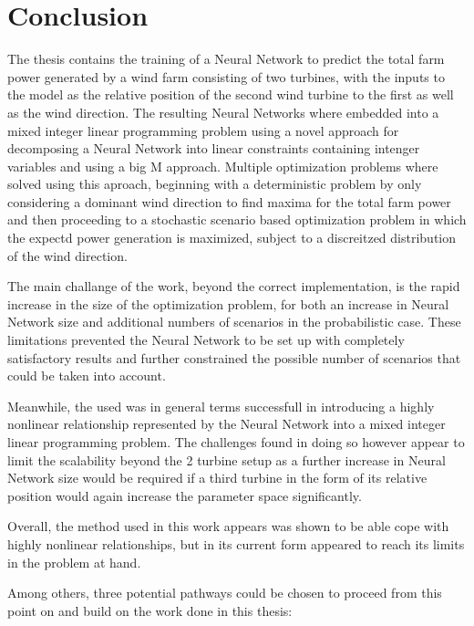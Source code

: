 
\chapter{Conclusion}\label{chapter:conclusion}

The thesis contains the training of a Neural Network to predict the total farm power generated by a wind farm consisting of two turbines, with the inputs to the model as the relative position of the second wind turbine to the first as well as the wind direction. The resulting Neural Networks where embedded into a mixed integer linear programming problem using a novel approach for decomposing a Neural Network into linear constraints containing intenger variables and using a big M approach. Multiple optimization problems where solved using this aproach, beginning with a deterministic problem by only considering a dominant wind direction to find maxima for the total farm power and then proceeding to a stochastic scenario based optimization problem in which the expectd power generation is maximized, subject to a discreitzed distribution of the wind direction. 

The main challange of the work, beyond the correct implementation, is the rapid increase in the size of the optimization problem, for both an increase in Neural Network size and additional numbers of scenarios in the probabilistic case. These limitations prevented the Neural Network to be set up with completely satisfactory results and further constrained the possible number of scenarios that could be taken into account. 

Meanwhile, the used was in general terms successfull in introducing a highly nonlinear relationship represented by the Neural Network into a mixed integer linear programming problem. The challenges found in doing so however appear to limit the scalability beyond the 2 turbine setup as a further increase in Neural Network size would be required if a third turbine in the form of its relative position would again increase the parameter space significantly. 

Overall, the method used in this work appears was shown to be able cope with highly nonlinear relationships, but in its current form appeared to reach its limits in the problem at hand. 

Among others, three potential pathways could be chosen to proceed from this point on and build on the work done in this thesis: 

